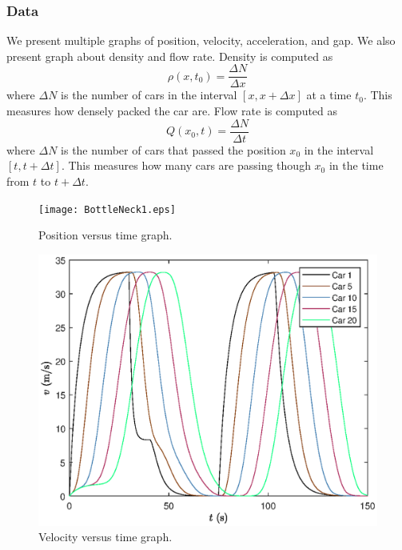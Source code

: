 \documentclass[12pt]{article}
\begin{document}
    \subsubsection{Data}
    We present multiple graphs of position, velocity, acceleration, and gap. We also present graph about density and flow rate. Density is computed as 
    \begin{equation} 
      \rho(x,t_0) = \frac{\Delta N}{\Delta x}
    \end{equation}
    where $\Delta N$ is the number of cars  in the interval $[x, x+\Delta x]$ at a time $t_0$. This measures how densely packed the car are. Flow rate is computed as 
    \begin{equation} 
      Q(x_0,t) = \frac{\Delta N}{\Delta t}
    \end{equation}
    where $\Delta N$ is the number of cars that passed the position $x_0$ in the interval $[t, t +\Delta t]$. This measures how many cars are passing though $x_0$ in the time from $t$ to $t + \Delta t$. 
    \begin{figure}[H]
      \texttt{[image: BottleNeck1.eps]}
      \centering
      \caption{Position versus time graph.}
      \label{fig:obstaclePos}
  \end{figure}

  \begin{figure}[H]
    \includegraphics[width=13cm]{BottleNeck2.eps}
    \centering
    \caption{Velocity versus time graph.}
    \label{fig:obstacleVel}
  \end{figure}
\end{document}
